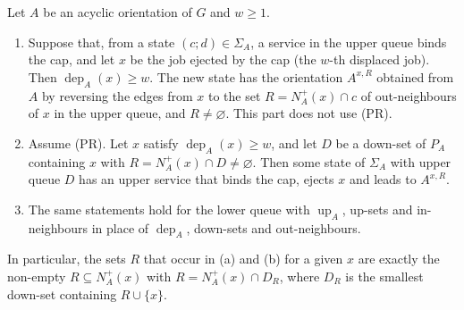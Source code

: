 \documentclass[11pt,a4paper]{article}
\theoremstyle{plain}
\theoremstyle{plain}
\newcommand{\dep}{\operatorname{dep}}
\newcommand{\up}{\operatorname{up}}
\newcommand{\Nout}{N^{+}}
\newcommand{\Sg}{\Sigma}
\newcommand{\empt}{\varnothing}
\begin{document}
\begin{lemma}\label{lem:moves}
Let $A$ be an acyclic orientation of $G$ and $w\ge1$.
\begin{enumerate}[label=(\alph*)]
\item Suppose that, from a state $(c;d)\in\Sg_A$, a service in the upper queue binds the cap, and let $x$ be the job ejected by the cap (the $w$-th displaced job). Then $\dep_A(x)\ge w$. The new state has the orientation $A^{x,R}$ obtained from $A$ by reversing the edges from $x$ to the set $R=\Nout_A(x)\cap c$ of out-neighbours of $x$ in the upper queue, and $R\neq\empt$. This part does not use (PR).
\item Assume (PR). Let $x$ satisfy $\dep_A(x)\ge w$, and let $D$ be a down-set of $P_A$ containing $x$ with $R=\Nout_A(x)\cap D\neq\empt$. Then some state of $\Sg_A$ with upper queue $D$ has an upper service that binds the cap, ejects $x$ and leads to $A^{x,R}$.
\item The same statements hold for the lower queue with $\up_A$, up-sets and in-neighbours in place of $\dep_A$, down-sets and out-neighbours.
\end{enumerate}
In particular, the sets $R$ that occur in (a) and (b) for a given $x$ are exactly the non-empty $R\subseteq\Nout_A(x)$ with $R=\Nout_A(x)\cap D_R$, where $D_R$ is the smallest down-set containing $R\cup\{x\}$.
\end{lemma}
\end{document}
